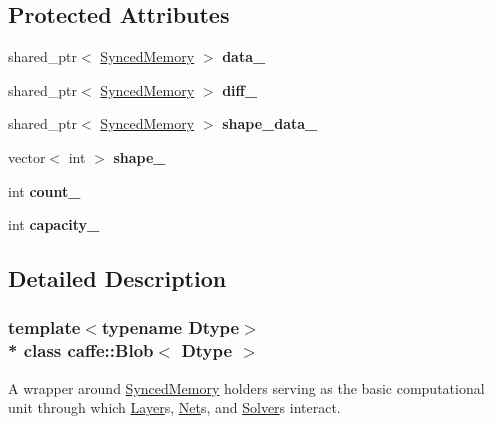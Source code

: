 \subsection*{Protected Attributes}
\begin{DoxyCompactItemize}
\item 
shared\+\_\+ptr$<$ \hyperlink{classcaffe_1_1SyncedMemory}{Synced\+Memory} $>$ {\bfseries data\+\_\+}\hypertarget{classcaffe_1_1Blob_a5240277a3cea1bc530deca40ca0d0e16}{}\label{classcaffe_1_1Blob_a5240277a3cea1bc530deca40ca0d0e16}

\item 
shared\+\_\+ptr$<$ \hyperlink{classcaffe_1_1SyncedMemory}{Synced\+Memory} $>$ {\bfseries diff\+\_\+}\hypertarget{classcaffe_1_1Blob_a9310f9007aa45e529cb6d69d32dbb80c}{}\label{classcaffe_1_1Blob_a9310f9007aa45e529cb6d69d32dbb80c}

\item 
shared\+\_\+ptr$<$ \hyperlink{classcaffe_1_1SyncedMemory}{Synced\+Memory} $>$ {\bfseries shape\+\_\+data\+\_\+}\hypertarget{classcaffe_1_1Blob_af67df400170ae040ccc680e580b3b578}{}\label{classcaffe_1_1Blob_af67df400170ae040ccc680e580b3b578}

\item 
vector$<$ int $>$ {\bfseries shape\+\_\+}\hypertarget{classcaffe_1_1Blob_a5de50aa2b0e48b52d26ae8fe1c7dca82}{}\label{classcaffe_1_1Blob_a5de50aa2b0e48b52d26ae8fe1c7dca82}

\item 
int {\bfseries count\+\_\+}\hypertarget{classcaffe_1_1Blob_acf06ea13a3a14f77c178a525c35a3ea0}{}\label{classcaffe_1_1Blob_acf06ea13a3a14f77c178a525c35a3ea0}

\item 
int {\bfseries capacity\+\_\+}\hypertarget{classcaffe_1_1Blob_a33b722653651763f4cf07c3658a6de33}{}\label{classcaffe_1_1Blob_a33b722653651763f4cf07c3658a6de33}

\end{DoxyCompactItemize}


\subsection{Detailed Description}
\subsubsection*{template$<$typename Dtype$>$\\*
class caffe\+::\+Blob$<$ Dtype $>$}

A wrapper around \hyperlink{classcaffe_1_1SyncedMemory}{Synced\+Memory} holders serving as the basic computational unit through which \hyperlink{classcaffe_1_1Layer}{Layer}s, \hyperlink{classcaffe_1_1Net}{Net}s, and \hyperlink{classcaffe_1_1Solver}{Solver}s interact. 

